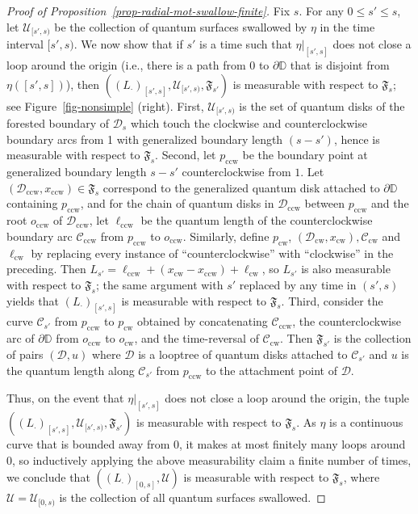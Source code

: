 \documentclass[a4paper]{article}
\numberwithin{equation}{section}
\newcommand{\D}{\mathbb{D}}
\newcommand{\cC}{\mathcal{C}}
\newcommand{\cD}{\mathcal{D}}
\theoremstyle{remark}
\numberwithin{equation}{section}
\begin{document}
\begin{proof}[{Proof of Proposition~\ref{prop-radial-mot-swallow-finite}}]
Fix $s$. For any $0 \leq s' \leq s$, let $\mathcal U_{[s',s)}$ be the collection of quantum surfaces swallowed by $\eta$ in the time interval $[s', s)$. 
We now show that if $s'$ is a time such that $\eta|_{[s', s]}$ does not close a loop around the origin (i.e., there is a path from $0$ to $\partial \D$ that is disjoint from $\eta([s', s])$), then $((L_\cdot)_{[s', s]}, \mathcal U_{[s', s)}, \mathfrak F_{s'})$ is measurable with respect to $\mathfrak F_s$; see Figure~\ref{fig-nonsimple} (right). First, $\mathcal U_{[s', s)}$ is the set of quantum disks of the forested boundary of $\cD_s$ which touch the clockwise and counterclockwise boundary arcs from 1 with generalized boundary length $(s-s')$, hence is measurable with respect to $\mathfrak F_s$. Second, let $p_\mathrm{ccw}$ be the boundary point at generalized boundary length $s - s'$ counterclockwise from $1$. Let $(\cD_\mathrm{ccw}, x_\mathrm{ccw}) \in \mathfrak F_s$ correspond to the generalized quantum disk attached to $\partial \D$ containing $p_\mathrm{ccw}$, and for the chain of quantum disks in $\cD_\mathrm{ccw}$ between $p_\mathrm{ccw}$ and the root $o_\mathrm{ccw}$ of $\cD_\mathrm{ccw}$, let $\ell_\mathrm{ccw}$ be the quantum length of the counterclockwise boundary arc $\cC_\mathrm{ccw}$ from $p_\mathrm{ccw}$ to $o_\mathrm{ccw}$. Similarly, define $p_\mathrm{cw}$, $(\cD_\mathrm{cw}, x_\mathrm{cw}), \cC_\mathrm{cw}$ and $\ell_\mathrm{cw}$ by replacing every instance of ``counterclockwise'' with ``clockwise'' in the preceding. Then $L_{s'} = \ell_\mathrm{ccw} + (x_\mathrm{cw} - x_\mathrm{ccw}) + \ell_\mathrm{cw}$, so $L_{s'}$ is also measurable with respect to $\mathfrak F_s$; the same argument with $s'$ replaced by any time in $(s', s)$ yields that $(L_\cdot)_{[s', s]}$ is measurable with respect to $\mathfrak F_s$. Third, consider the curve $\cC_{s'}$ from $p_\mathrm{ccw}$ to $p_\mathrm{cw}$ obtained by concatenating $\cC_\mathrm{ccw}$, the counterclockwise arc of $\partial \D$ from $o_\mathrm{ccw}$ to $o_\mathrm{cw}$, and the time-reversal of $\cC_\mathrm{cw}$. Then $\mathfrak F_{s'}$ is the collection of pairs $(\cD, u)$ where $\cD$ is a looptree of quantum disks attached to $\cC_{s'}$ and $u$ is the quantum length along $\cC_{s'}$ from $p_\mathrm{ccw}$ to the attachment point of $\cD$. 

Thus, on the event that $\eta|_{[s',s]}$ does not close a loop around the origin, the tuple $((L_\cdot)_{[s', s]}, \mathcal U_{[s', s)}, \mathfrak F_{s'})$ is measurable with respect to $\mathfrak F_s$. As $\eta$ is a continuous curve that is bounded away from $0$, it makes at most finitely many loops around $0$, so inductively applying the above measurability claim a finite number of times, we conclude that $((L_\cdot)_{[0,s]}, \mathcal U)$ is measurable with respect to $\mathfrak F_s$, where $\mathcal U = \mathcal U_{[0,s)}$ is the collection of all quantum surfaces swallowed. 





\end{proof}
\end{document}
